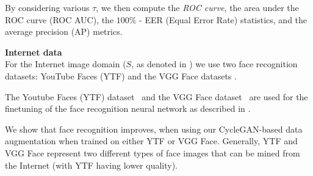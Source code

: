  By considering various $\tau$, we then compute the \textit{ROC curve}, the area under the ROC curve (ROC AUC), the $100$\% - EER (Equal Error Rate) statistics, and the average precision (AP) metrics. 


\bigskip\indent\textbf{Internet data}\\
For the Internet image domain ($S$, as denoted in ) we use two face recognition datasets: YouTube Faces (YTF) \cite{WolfHM11} and the VGG Face datasets \cite{parkhi2015deep}. %



 The Youtube Faces (YTF) dataset~\cite{WolfHM11} and the VGG Face dataset~\citep{parkhi2015deep} are used for the finetuning of the face recognition neural network as described in .


We show that face recognition improves, when using our CycleGAN-based data augmentation when trained on either YTF or VGG Face. Generally, YTF and VGG Face represent two different types of face images that can be mined from the Internet (with YTF having lower quality).







